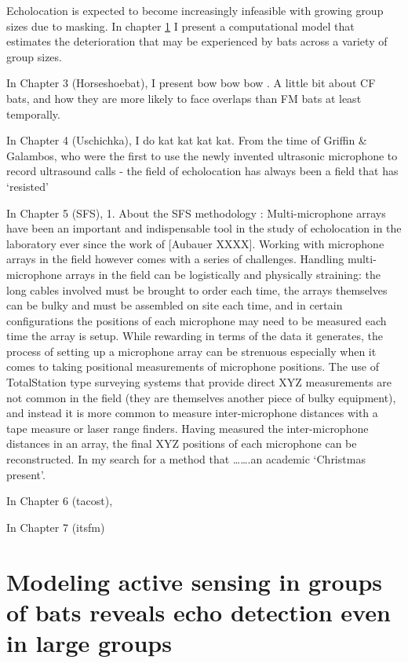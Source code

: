 \documentclass[
]{book}
\begin{document}
Echolocation is expected to become increasingly infeasible with growing group sizes due to masking. In chapter \ref{cpnchapter} I present a computational model that estimates the deterioration that may be experienced by bats across a variety of group sizes.

In Chapter 3 (Horseshoebat), I present bow bow bow . A little bit about CF bats, and how they are more likely to face overlaps than FM bats at least temporally.

In Chapter 4 (Uschichka), I do kat kat kat kat. From the time of Griffin \& Galambos, who were the first to use the newly invented ultrasonic microphone to record ultrasound calls - the field of echolocation has always been a field that has `resisted'

In Chapter 5 (SFS),
1. About the SFS methodology : Multi-microphone arrays have been an important and indispensable tool in the study of echolocation in the laboratory ever since the work of {[}Aubauer XXXX{]}. Working with microphone arrays in the field however comes with a series of challenges. Handling multi-microphone arrays in the field can be logistically and physically straining: the long cables involved must be brought to order each time, the arrays themselves can be bulky and must be assembled on site each time, and in certain configurations the positions of each microphone may need to be measured each time the array is setup. While rewarding in terms of the data it generates, the process of setting up a microphone array can be strenuous especially when it comes to taking positional measurements of microphone positions. The use of TotalStation type surveying systems that provide direct XYZ measurements are not common in the field (they are themselves another piece of bulky equipment), and instead it is more common to measure inter-microphone distances with a tape measure or laser range finders. Having measured the inter-microphone distances in an array, the final XYZ positions of each microphone can be reconstructed. In my search for a method that \ldots\ldots.an academic `Christmas present'.

In Chapter 6 (tacost),

In Chapter 7 (itsfm)

\hypertarget{cpnchapter}{%
\chapter{Modeling active sensing in groups of bats reveals echo detection even in large groups}\label{cpnchapter}}
\end{document}
